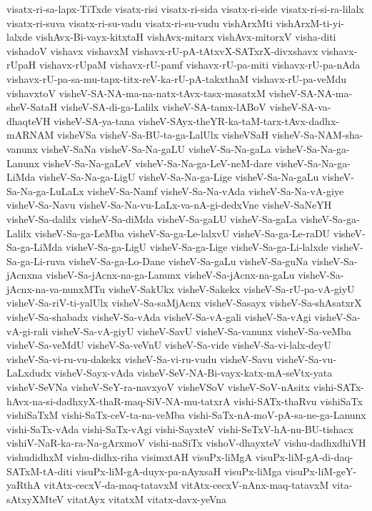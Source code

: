 {visatx-ri-sa-lapx-TiTxde
visatx-risi
visatx-ri-sida
visatx-ri-side
visatx-ri-si-ra-lilalx
visatx-ri-suva
visatx-ri-su-vadu
visatx-ri-su-vudu
vishArxMti
vishArxM-ti-yi-lalxde
vishAvx-Bi-vayx-kitxtaH
vishAvx-mitarx
vishAvx-mitorxV
visha-diti
vishadoV
vishavx
vishavxM
vishavx-rU-pA-tAtxvX-SATxrX-divxshavx
vishavx-rUpaH
vishavx-rUpaM
vishavx-rU-pamf
vishavx-rU-pa-miti
vishavx-rU-pa-nAda
vishavx-rU-pa-sa-mu-tapx-titx-reV-ka-rU-pA-takxthaM
vishavx-rU-pa-veMdu
vishavxtoV
visheV-SA-NA-ma-na-natx-tAvx-tasx-masatxM
visheV-SA-NA-ma-sheV-SataH
visheV-SA-di-ga-Lalilx
visheV-SA-tamx-lABoV
visheV-SA-va-dhaqteVH
visheV-SA-ya-tana
visheV-SAyx-theYR-ka-taM-tarx-tAvx-dadhx-mARNAM
visheVSa
visheV-Sa-BU-ta-ga-LalUlx
visheVSaH
visheV-Sa-NAM-sha-vanunx
visheV-SaNa
visheV-Sa-Na-gaLU
visheV-Sa-Na-gaLa
visheV-Sa-Na-ga-Lanunx
visheV-Sa-Na-gaLeV
visheV-Sa-Na-ga-LeV-neM-dare
visheV-Sa-Na-ga-LiMda
visheV-Sa-Na-ga-LigU
visheV-Sa-Na-ga-Lige
visheV-Sa-Na-gaLu
visheV-Sa-Na-ga-LuLaLx
visheV-Sa-Namf
visheV-Sa-Na-vAda
visheV-Sa-Na-vA-giye
visheV-Sa-Navu
visheV-Sa-Na-vu-LaLx-va-nA-gi-dedxVne
visheV-SaNeYH
visheV-Sa-dalilx
visheV-Sa-diMda
visheV-Sa-gaLU
visheV-Sa-gaLa
visheV-Sa-ga-Lalilx
visheV-Sa-ga-LeMba
visheV-Sa-ga-Le-lalxvU
visheV-Sa-ga-Le-raDU
visheV-Sa-ga-LiMda
visheV-Sa-ga-LigU
visheV-Sa-ga-Lige
visheV-Sa-ga-Li-lalxde
visheV-Sa-ga-Li-ruva
visheV-Sa-ga-Lo-Dane
visheV-Sa-gaLu
visheV-Sa-guNa
visheV-Sa-jAcnxna
visheV-Sa-jAcnx-na-ga-Lanunx
visheV-Sa-jAcnx-na-gaLu
visheV-Sa-jAcnx-na-va-nunxMTu
visheV-SakUkx
visheV-Sakekx
visheV-Sa-rU-pa-vA-giyU
visheV-Sa-riV-ti-yalUlx
visheV-Sa-saMjAcnx
visheV-Sasayx
visheV-Sa-shAsatxrX
visheV-Sa-shabadx
visheV-Sa-vAda
visheV-Sa-vA-gali
visheV-Sa-vAgi
visheV-Sa-vA-gi-rali
visheV-Sa-vA-giyU
visheV-SavU
visheV-Sa-vanunx
visheV-Sa-veMba
visheV-Sa-veMdU
visheV-Sa-veVnU
visheV-Sa-vide
visheV-Sa-vi-lalx-deyU
visheV-Sa-vi-ru-vu-dakekx
visheV-Sa-vi-ru-vudu
visheV-Savu
visheV-Sa-vu-LaLxdudx
visheV-Sayx-vAda
visheV-SeV-NA-Bi-vayx-katx-mA-seVtx-yata
visheV-SeVNa
visheV-SeY-ra-navxyoV
visheVSoV
visheV-SoV-nAsitx
vishi-SATx-hAvx-na-si-dadhxyX-thaR-maq-SiV-NA-mu-tatxrA
vishi-SATx-thaRvu
vishiSaTx
vishiSaTxM
vishi-SaTx-ceV-ta-na-veMba
vishi-SaTx-nA-moV-pA-sa-ne-ga-Lanunx
vishi-SaTx-vAda
vishi-SaTx-vAgi
vishi-SayxteV
vishi-SeTxV-hA-nu-BU-tishacx
vishiV-NaR-ka-ra-Na-gArxmoV
vishi-naSiTx
vishoV-dhayxteV
vishu-dadhxdhiVH
vishudidhxM
vishu-didhx-riha
visimxtAH
visuPx-liMgA
visuPx-liM-gA-di-daq-SATxM-tA-diti
visuPx-liM-gA-duyx-pa-nAyxsaH
visuPx-liMga
visuPx-liM-geY-yaRthA
vitAtx-cecxV-da-maq-tatavxM
vitAtx-cecxV-nAnx-maq-tatavxM
vita-sAtxyXMteV
vitatAyx
vitatxM
vitatx-davx-yeVna
}
